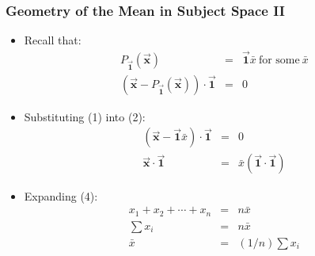 \documentclass{beamer}
\begin{document}







\begin{frame}
  \frametitle{Geometry of the Mean in Subject Space II}

\begin{itemize}
\item Recall that:
\begin{eqnarray}
P_{\vec{\mathbf{1}}}(\vec{\mathbf{x}}) & = & \vec{\mathbf{1}}\bar{x} \ \mbox{for some}\ \bar{x} \\
%
(\vec{\mathbf{x}} - P_{\vec{\mathbf{1}}}(\vec{\mathbf{x}})) \cdot \vec{\mathbf{1}} & = & 0
\end{eqnarray}

\item Substituting (1) into (2):
\begin{eqnarray}
(\vec{\mathbf{x}} - \vec{\mathbf{1}}\bar{x}) \cdot \vec{\mathbf{1}} & = & 0 \\
%
\vec{\mathbf{x}} \cdot \vec{\mathbf{1}} & = & \bar{x} (\vec{\mathbf{1}} \cdot \vec{\mathbf{1}})
\end{eqnarray}

\item Expanding (4):
\begin{eqnarray}
x_1 + x_2 + \cdots + x_n & = & n \bar{x} \\
%
\sum x_i & = & n \bar{x} \\
%
\bar{x} & = & (1/n) \sum x_i
\end{eqnarray}

\end{itemize}


\end{frame}
\end{document}

